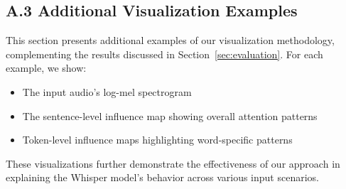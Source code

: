 \documentclass[../report.tex]{subfiles}
\begin{document}
    \subsection*{A.3 Additional Visualization Examples}
    \label{subsec:additional_viz}
    This section presents additional examples of our visualization methodology, complementing the results discussed in Section~\ref{sec:evaluation}. For each example, we show:
    \begin{itemize}
        \item The input audio's log-mel spectrogram
        \item The sentence-level influence map showing overall attention patterns
        \item Token-level influence maps highlighting word-specific patterns
    \end{itemize}
    These visualizations further demonstrate the effectiveness of our approach in explaining the Whisper model's behavior across various input scenarios.
\end{document}
